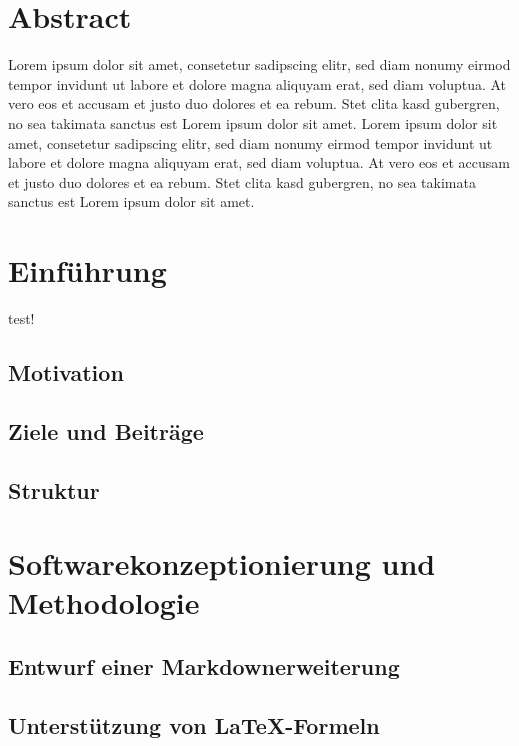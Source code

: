 \documentclass{article}
\begin{document}
\maketitle
\section*{Abstract}
Lorem ipsum dolor sit amet, consetetur sadipscing elitr, sed diam nonumy eirmod tempor invidunt ut labore et dolore magna aliquyam erat, sed diam voluptua. At vero eos et accusam et justo duo dolores et ea rebum. Stet clita kasd gubergren, no sea takimata sanctus est Lorem ipsum dolor sit amet. Lorem ipsum dolor sit amet, consetetur sadipscing elitr, sed diam nonumy eirmod tempor invidunt ut labore et dolore magna aliquyam erat, sed diam voluptua. At vero eos et accusam et justo duo dolores et ea rebum. Stet clita kasd gubergren, no sea takimata sanctus est Lorem ipsum dolor sit amet.
\tableofcontents
\newpage


\section{Einführung}
test! \cite{example}
\subsection{Motivation}
\subsection{Ziele und Beitr\"age}
\subsection{Struktur}
\section{Softwarekonzeptionierung und Methodologie}
\subsection{Entwurf einer Markdownerweiterung}
\subsection{Unterst\"utzung von \LaTeX-Formeln}
\end{document}
